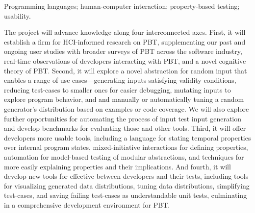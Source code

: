 \smallskip

 Programming languages; human-computer
interaction; property-based testing; usability.

The project will advance knowledge along four
\iflater {} \fi
interconnected axes.
%
First, it will establish a firm  for HCI-informed
research on PBT, supplementing our past and ongoing user studies with
broader surveys of PBT across the software industry, real-time
observations of developers interacting with PBT, and a novel cognitive
theory of PBT.
%
Second, it will explore a novel abstraction for random input  that enables a range of use cases---generating inputs
satisfying validity conditions, reducing test-cases to smaller ones for easier
debugging,
mutating inputs to explore program behavior, and
and manually or automatically tuning a random
generator's distribution based on examples or code coverage. We will also
explore further opportunities for automating the process of input test input
generation and develop benchmarks for evaluating those and other tools.
%
Third, it will offer developers more usable  tools,
including a language for stating temporal properties over internal
program states, mixed-initiative interactions for defining properties,
automation for model-based testing of
modular abstractions, and techniques for more easily explaining properties and
their implications.
%
And fourth, it will develop new tools for effective  between developers and their tests, including tools for
visualizing generated data
distributions, tuning data distributions, simplifying test-cases, and saving
  failing test-cases as understandable unit tests, culminating in a
  comprehensive development environment for PBT.


